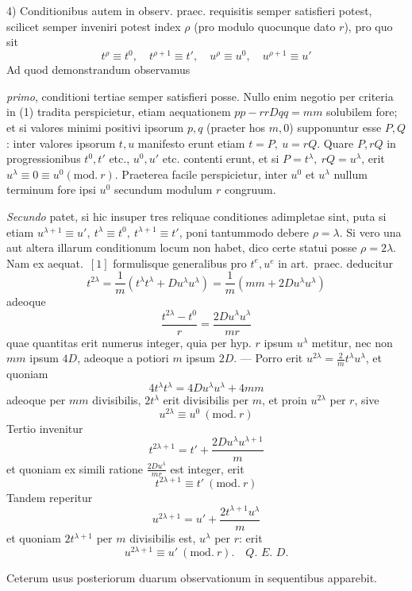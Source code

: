 4) Conditionibus autem in observ. praec. requisitis semper satisfieri potest, scilicet semper inveniri potest index \(\rho\) (pro modulo quocunque dato \(r\)), pro quo sit
\[
t^\rho\equiv t^0,\quad t^{\rho+1}\equiv t',\quad u^\rho\equiv u^0,\quad u^{\rho+1}\equiv u'
\]
Ad quod demonstrandum observamus

\textit{primo}, conditioni tertiae semper satisfieri posse. Nullo enim negotio per criteria in (1) tradita perspicietur, etiam aequationem \(pp-rrDqq=mm\) solubilem fore; et si valores minimi positivi ipsorum \(p,q\) (praeter hos \(m,0\)) supponuntur esse \(P,Q\): inter valores ipsorum \(t,u\) manifesto erunt etiam \(t=P,\ u=rQ\). Quare \(P,rQ\) in progressionibus \(t^0,t'\) etc., \(u^0,u'\) etc. contenti erunt, et si \(P=t^\lambda,\ rQ=u^\lambda\), erit \(u^\lambda\equiv0\equiv u^0(\mathrm{mod.}\ r)\). Praeterea facile perspicietur, inter \(u^0\) et \(u^\lambda\) nullum terminum fore ipsi \(u^0\) secundum modulum \(r\) congruum.

\textit{Secundo} patet, si hic insuper tres reliquae conditiones adimpletae sint, puta si etiam \(u^{\lambda+1}\equiv u',\ t^\lambda\equiv t^0,\ t^{\lambda+1}\equiv t'\), poni tantummodo debere \(\rho=\lambda\). Si
vero una aut altera illarum conditionum locum non habet, dico certe statui posse \(\rho=2\lambda\). Nam ex aequat.~\([1]\) formulisque generalibus pro \(t^e,u^e\) in art.~praec. deducitur
\[
t^{2\lambda}=\frac1m(t^\lambda t^\lambda+Du^\lambda u^\lambda)=\frac1m(mm+2Du^\lambda u^\lambda)
\]
adeoque
\[
\frac{t^{2\lambda}-t^0}{r}=\frac{2Du^\lambda u^\lambda}{mr}
\]
quae quantitas erit numerus integer, quia per hyp. \(r\) ipsum \(u^\lambda\) metitur, nec non \(mm\) ipsum \(4D\), adeoque a potiori \(m\) ipsum \(2D\). --- Porro erit \(u^{2\lambda}=\frac2m t^\lambda u^\lambda\), et quoniam
\[
4t^\lambda t^\lambda=4Du^\lambda u^\lambda+4mm
\]
adeoque per \(mm\) divisibilis, \(2t^\lambda\) erit divisibilis per \(m\), et proin \(u^{2\lambda}\) per \(r\), sive
\[
u^{2\lambda}\equiv u^0\ (\mathrm{mod.}\ r)
\]
Tertio invenitur
\[
t^{2\lambda+1}=t'+\frac{2Du^\lambda u^{\lambda+1}}{m}
\]
et quoniam ex simili ratione \(\frac{2Du^\lambda}{mr}\) est integer, erit
\[
t^{2\lambda+1}\equiv t'\ (\mathrm{mod.}\ r)
\]
Tandem reperitur
\[
u^{2\lambda+1}=u'+\frac{2t^{\lambda+1}u^\lambda}{m}
\]
et quoniam \(2t^{\lambda+1}\) per \(m\) divisibilis est, \(u^\lambda\) per \(r\): erit
\[
u^{2\lambda+1}\equiv u'\ (\mathrm{mod.}\ r).\quad \textit{Q.~E.~D.}
\]

Ceterum usus posteriorum duarum observationum in sequentibus apparebit.

